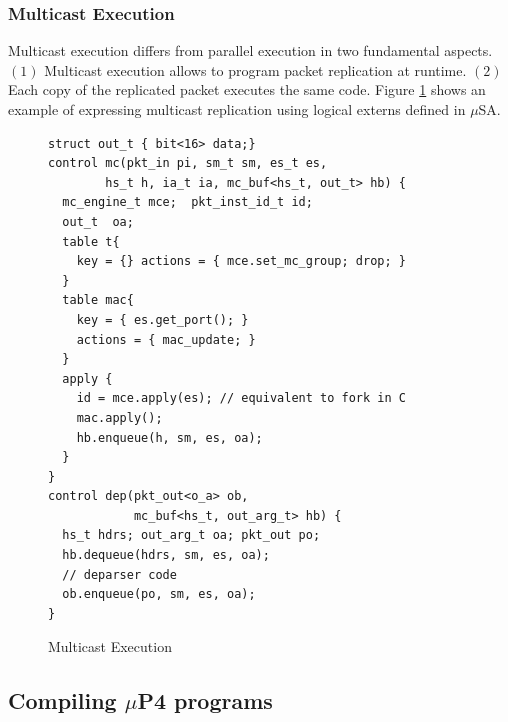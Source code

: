 \subsubsection{Multicast Execution}
\label{subsubsection:multicast-execution}
Multicast execution differs from parallel execution in two fundamental aspects.
$(1)$ Multicast execution allows to program packet replication at runtime.
$(2)$ Each copy of the replicated packet executes the same code.
Figure \ref{fig:multicast-execution} shows an example of expressing multicast replication using logical externs defined in $\mu$SA.
\begin{figure}[ht]
\begin{lstlisting}[frame=none]
struct out_t { bit<16> data;}
control mc(pkt_in pi, sm_t sm, es_t es, 
        hs_t h, ia_t ia, mc_buf<hs_t, out_t> hb) {
  mc_engine_t mce;  pkt_inst_id_t id; 
  out_t  oa;
  table t{
    key = {} actions = { mce.set_mc_group; drop; }
  }
  table mac{
    key = { es.get_port(); } 
    actions = { mac_update; }
  }
  apply {
    id = mce.apply(es); // equivalent to fork in C
    mac.apply();
    hb.enqueue(h, sm, es, oa);
  }
}
control dep(pkt_out<o_a> ob, 
            mc_buf<hs_t, out_arg_t> hb) {
  hs_t hdrs; out_arg_t oa; pkt_out po;
  hb.dequeue(hdrs, sm, es, oa);
  // deparser code 
  ob.enqueue(po, sm, es, oa);
}
\end{lstlisting}
\caption{Multicast Execution}
\label{fig:multicast-execution}
\end{figure}

\subsection{Compiling $\mu$P4 programs}

